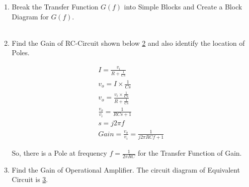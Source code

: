 \begin{enumerate}[label=\thesection.\arabic*.,ref=\thesection.\theenumi]
%
%
\item Break the Transfer Function $G(f)$ into Simple Blocks and Create a Block Diagram for $G(f)$.\\
\solution\\
\begin{figure}[ht!]
	\begin{center}
		\resizebox{\columnwidth}{!}{}
	\end{center}
	\caption{}
	\label{fig:ee18btech11014_RC Circuit}
\end{figure}

\item Find the Gain of RC-Circuit shown below \ref{fig:ee18btech11014_RC Circuit} and also identify the location of Poles.
\begin{figure}[ht!]
	\begin{center}
		\resizebox{\columnwidth/2}{!}{}
	\end{center}
	\caption{}
	\label{fig:ee18btech11014_RC Circuit}
\end{figure}

\solution
\begin{align}
I = \frac{v_{i}}{R + \frac{1}{Cs}}\\
v_{o} = I \times \frac{1}{Cs}\\
v_{o} = \frac{v_{i} \times \frac{1}{Cs}}{R + \frac{1}{Cs}}\\
\frac{v_{o}}{v_{i}} = \frac{1}{RCs + 1}\\
s = j2\pi f\\
Gain = \frac{v_{o}}{v_{i}} = \frac{1}{j2\pi RCf + 1}
\end{align}

So, there is a Pole at frequency $f = \frac{1}{2\pi RC}$ for the Transfer Function of Gain.\\
\item Find the Gain of Operational Amplifier. The circuit diagram of Equivalent Circuit is \ref{fig:ee18btech11014_OpAmp Circuit}.
\begin{figure}[ht!]
	\begin{center}
		\resizebox{\columnwidth}{!}{}
	\end{center}
	\caption{}
	\label{fig:ee18btech11014_OpAmp Circuit}
\end{figure}


\end{enumerate}
